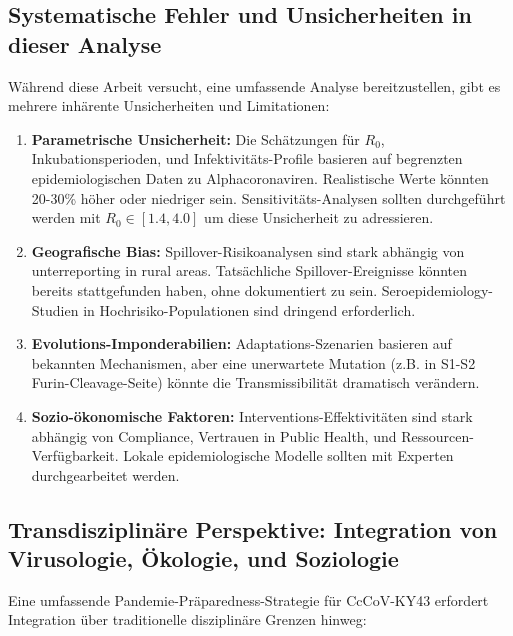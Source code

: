 ﻿\documentclass[11pt,a4paper]{article}
\theoremstyle{definition}
\begin{document}
\subsection{Systematische Fehler und Unsicherheiten in dieser Analyse}

Während diese Arbeit versucht, eine umfassende Analyse bereitzustellen, gibt es mehrere inhärente Unsicherheiten und Limitationen:

\begin{enumerate}
\item \textbf{Parametrische Unsicherheit:} Die Schätzungen für $R_0$, Inkubationsperioden, und Infektivi\-täts-Profile basieren auf begrenzten epidemiologischen Daten zu Alphacoronaviren. Realistische Werte könnten 20-30\% höher oder niedriger sein. Sensitivitäts-Analysen sollten durchgeführt werden mit $R_0 \in [1.4, 4.0]$ um diese Unsicherheit zu adressieren.

\item \textbf{Geografische Bias:} Spillover-Risikoanalysen sind stark abhängig von unterreporting in rural areas. Tatsächliche Spillover-Ereignisse könnten bereits stattgefunden haben, ohne dokumentiert zu sein. Seroepidemiology-Studien in Hochrisiko-Populationen sind dringend erforderlich.

\item \textbf{Evolutions-Imponderabilien:} Adaptations-Szenarien basieren auf bekannten Mechanismen, aber eine unerwartete Mutation (z.B. in S1-S2 Furin-Cleavage-Seite) könnte die Transmissibilität dramatisch verändern.

\item \textbf{Sozio-ökonomische Faktoren:} Interventions-Effektivitäten sind stark abhängig von Compliance, Vertrauen in Public Health, und Ressourcen-Verfügbarkeit. Lokale epidemiologische Modelle sollten mit Experten durchgearbeitet werden.
\end{enumerate}

\subsection{Transdisziplinäre Perspektive: Integration von Virusologie, Ökologie, und Soziologie}

Eine umfassende Pandemie-Präparedness-Strategie für CcCoV-KY43 erfordert Integration über traditionelle disziplinäre Grenzen hinweg:
\end{document}
